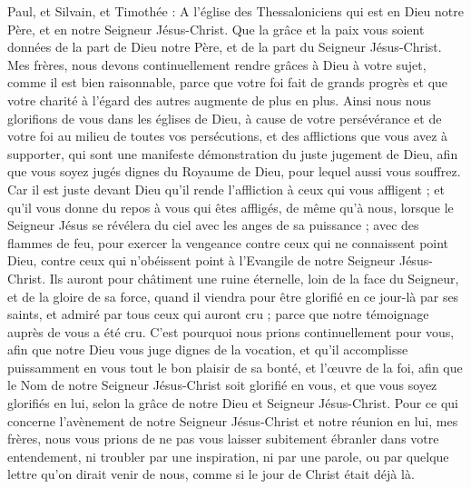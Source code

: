 \begin{multicols}{2}
\VerseOne{}Paul, et Silvain, et Timothée : A l'église des Thessaloniciens qui est en Dieu notre Père, et en notre Seigneur Jésus-Christ.
Que la grâce et la paix vous soient données de la part de Dieu notre Père, et de la part du Seigneur Jésus-Christ.
Mes frères, nous devons continuellement rendre grâces à Dieu à votre sujet, comme il est bien raisonnable, parce que votre foi fait de grands progrès et que votre charité à l’égard des autres augmente de plus en plus.
Ainsi nous nous glorifions de vous dans les églises de Dieu, à cause de votre persévérance et de votre foi au milieu de toutes vos persécutions, et des afflictions que vous avez à supporter,
qui sont une manifeste démonstration du juste jugement de Dieu, afin que vous soyez jugés dignes du Royaume de Dieu, pour lequel aussi vous souffrez.
Car il est juste devant Dieu qu'il rende l'affliction à ceux qui vous affligent ;
et qu'il vous donne du repos à vous qui êtes affligés, de même qu'à nous, lorsque le Seigneur Jésus se révélera du ciel avec les anges de sa puissance ;
avec des flammes de feu, pour exercer la vengeance contre ceux qui ne connaissent point Dieu, contre ceux qui n'obéissent point à l'Evangile de notre Seigneur Jésus-Christ.
Ils auront pour châtiment une ruine éternelle, loin de la face du Seigneur, et de la gloire de sa force,
quand il viendra pour être glorifié en ce jour-là par ses saints, et admiré par tous ceux qui auront cru ; parce que notre témoignage auprès de vous a été cru.
C'est pourquoi nous prions continuellement pour vous, afin que notre Dieu vous juge dignes de la vocation, et qu'il accomplisse puissamment en vous tout le bon plaisir de sa bonté, et l’œuvre de la foi,
afin que le Nom de notre Seigneur Jésus-Christ soit glorifié en vous, et que vous soyez glorifiés en lui, selon la grâce de notre Dieu et Seigneur Jésus-Christ.
\VerseOne{}Pour ce qui concerne l'avènement de notre Seigneur Jésus-Christ et notre réunion en lui, mes frères, nous vous prions
de ne pas vous laisser subitement ébranler dans votre entendement, ni troubler par une inspiration, ni par une parole, ou par quelque lettre qu’on dirait venir de nous, comme si le jour de Christ était déjà là.

\end{multicols}
